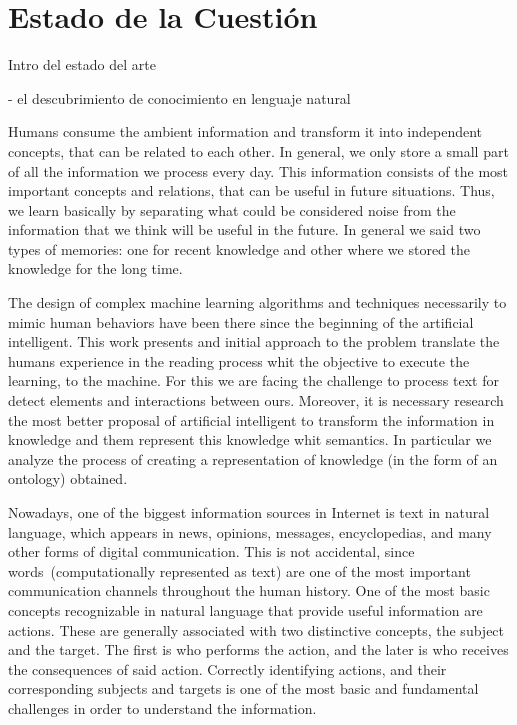 \chapter{Estado de la Cuestión}\label{Chap:SOTA}

Intro del estado del arte

- el descubrimiento de conocimiento en lenguaje natural

Humans consume the ambient information and transform
it into independent concepts, that can be related to each other. In general,
we only store a small part of all the information we process every day.
This information consists of the most important concepts and relations,
that can be useful in future situations.
Thus, we learn basically by separating what could be
considered noise from the information that we think will be useful in the future.
In general we said two types of memories: one for recent knowledge and 
other where we stored the knowledge for the long time.

The design of complex machine learning algorithms and techniques necessarily
to mimic human behaviors have been there since the beginning of the artificial intelligent.
This work presents and initial approach to the problem translate the 
humans experience in the reading process whit the objective to
execute the learning, to the machine. 
For this we are facing the challenge to process text for detect elements
and interactions between ours. Moreover, it is  necessary research the most better 
proposal of artificial intelligent to transform the information in knowledge
and them represent this knowledge whit semantics.    
In particular we analyze the process of
creating a representation of knowledge (in the form of an ontology)
obtained. 

Nowadays, one of the biggest information sources in Internet
is text in natural language, which appears in news, opinions, messages, encyclopedias, 
and many other forms of digital communication.
This is not accidental, since words~(computationally represented as text) 
are one of the most important communication channels throughout the human history.
One of the most basic concepts recognizable in natural language that provide
useful information are actions. These are generally associated with two
distinctive concepts, the subject and the target. The first is who performs
the action, and the later is who receives the consequences of said action.
Correctly identifying actions, and their corresponding subjects and targets
is one of the most basic and fundamental challenges in order to understand
the information.

